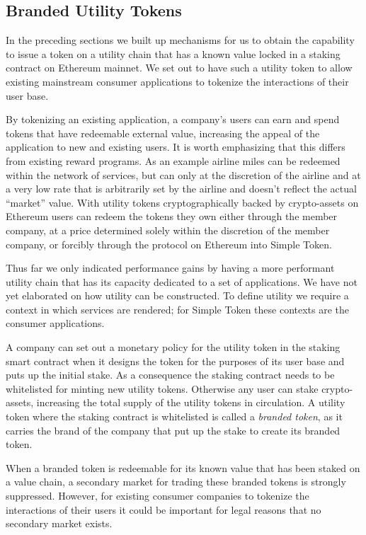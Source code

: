 \documentclass[12pt,a4paper, twocolumn]{article}
\begin{document}
\subsection{Branded Utility Tokens}
In the preceding sections we built up mechanisms for us to obtain the capability to issue a token on a utility chain that has a known value locked in a staking contract on Ethereum mainnet.  We set out to have such a utility token to allow existing mainstream consumer applications to tokenize the interactions of their user base. \par
By tokenizing an existing application, a company’s users can earn and spend tokens that have redeemable external value, increasing the appeal of the application to new and existing users.  It is worth emphasizing that this differs from existing reward programs. As an example airline miles can be redeemed within the network of services, but can only at the discretion of the airline and at a very low rate that is arbitrarily set by the airline and doesn’t reflect the actual “market” value.  With utility tokens cryptographically backed by crypto-assets on Ethereum users can redeem the tokens they own either through the member company, at a price determined solely within the discretion of the member company, or forcibly through the protocol on Ethereum into Simple Token. \par
Thus far we only indicated performance gains by having a more performant utility chain that has its capacity dedicated to a set of applications.  We have not yet elaborated on how utility can be constructed.  To define utility we require a context in which services are rendered; for Simple Token these contexts are the consumer applications. \par
A company can set out a monetary policy for the utility token in the staking smart contract when it designs the token for the purposes of its user base and puts up the initial stake.  As a consequence the staking contract needs to be whitelisted for minting new utility tokens.  Otherwise any user can stake crypto-assets, increasing the total supply of the utility tokens in circulation.  A utility token where the staking contract is whitelisted is called a \textit{branded token}, as it carries the brand of the company that put up the stake to create its branded token. \par
When a branded token is redeemable for its known value that has been staked on a value chain, a secondary market for trading these branded tokens is strongly suppressed.  However, for existing consumer companies to tokenize the interactions of their users it could be important for legal reasons that no secondary market exists. \par
\end{document}
